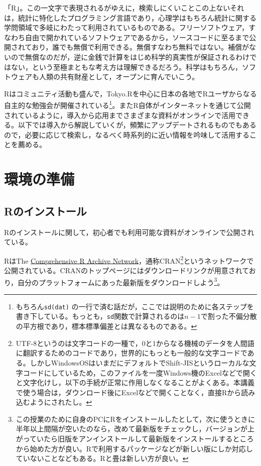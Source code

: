 \documentclass[
  a4paper,
]{ltjsbook}
\begin{document}
「R」。この一文字で表現されるがゆえに，検索しにくいことこの上ないそれは，統計に特化したプログラミング言語であり，心理学はもちろん統計に関する学問領域で多岐にわたって利用されているものである。フリーソフトウェア，すなわち自由で開かれているソフトウェアであるから，ソースコードに至るまで公開されており，誰でも無償で利用できる。無償すなわち無料ではない。補償がないので無償なのだが，逆に金銭で計算をはじめ科学的真実性が保証されるわけではない，という至極まともな考え方は理解できるだろう。科学はもちろん，ソフトウェアも人類の共有財産として，オープンに育んでいこう。

Rはコミュニティ活動も盛んで，Tokyo.Rを中心に日本の各地でRユーザからなる自主的な勉強会が開催されている\footnote{もちろん\texttt{sd(dat)}
  の一行で済む話だが，ここでは説明のために各ステップを書き下している。もっとも，\texttt{sd}関数で計算されるのは\(n-1\)で割った不偏分散の平方根であり，標本標準偏差とは異なるものである。}。またR自体がインターネットを通じて公開されているように，導入から応用までさまざまな資料がオンラインで活用できる。以下では導入から解説していくが，頻繁にアップデートされるものでもあるので，必要に応じて検索し，なるべく時系列的に近い情報を吟味して活用することを薦める。

\section{環境の準備}\label{ux74b0ux5883ux306eux6e96ux5099}

\subsection{Rのインストール}\label{rux306eux30a4ux30f3ux30b9ux30c8ux30fcux30eb}

Rのインストールに関して，初心者でも利用可能な資料がオンラインで公開されている。

RはThe \href{https://cran.r-project.org/}{Comprehensive R Archive
Network}，通称CRAN\footnote{UTF-8というのは文字コードの一種で，0と1からなる機械のデータを人間語に翻訳するためのコードであり，世界的にもっとも一般的な文字コードである。しかしWindowsOSはいまだにデフォルトでShift-JISというローカルな文字コードにしているため，このファイルを一度Windows機のExcelなどで開くと文字化けし，以下の手続が正常に作用しなくなることがよくある。本講義で使う場合は，ダウンロード後にExcelなどで開くことなく，直接Rから読み込むようにされたし。}というネットワークで公開されている。CRANのトップページにはダウンロードリンクが用意されており，自分のプラットフォームにあった最新版をダウンロードしよう\footnote{この授業のために自身のPCにRをインストールしたとして，次に使うときに半年以上間隔が空いたのなら，改めて最新版をチェックし，バージョンが上がっていたら旧版をアンインストールして最新版をインストールするところから始めた方が良い。Rで利用するパッケージなどが新しい版にしか対応していないことなどもある。Rと畳は新しい方が良い。}。
\end{document}
